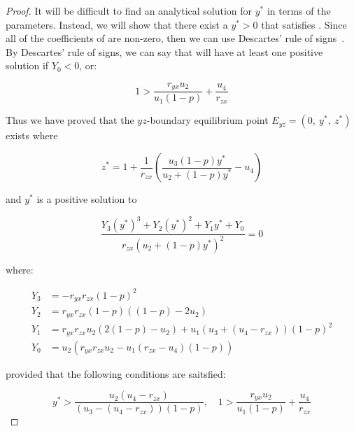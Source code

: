\begin{proof}
    It will be difficult to find an analytical solution for $y^*$ in terms of the parameters. Instead, we will show that there exist a $y^*>0$ that satisfies . Since all of the coefficients of  are non-zero, then we can use Descartes' rule of signs~\cite{WANG2004525526}. By Descartes' rule of signs, we can say that  will have at least one positive solution if $Y_0<0$, or:
    
    \begin{equation*}
        1>\frac{r_{yx}u_2}{u_1\left(1-p\right)}+\frac{u_4}{r_{zx}}
    \end{equation*}

    Thus we have proved that the $yz$-boundary equilibrium point $E_{yz}=\left(0,\ y^*,\ z^*\right)$ exists where
    
    \begin{equation*}
        z^*=1+\frac{1}{r_{zx}}\left(\frac{u_3\left(1-p\right)y^*}{u_2+\left(1-p\right)y^*}-u_4\right)
    \end{equation*}

    and $y^*$ is a positive solution to 

    \begin{equation*}
        \frac{Y_3\left(y^*\right)^3+Y_2\left(y^*\right)^2+Y_1y^*+Y_0}{r_{zx}\left(u_2+\left(1-p\right)y^*\right)^2}=0
    \end{equation*}

    where:

    \begin{align*}
        Y_3 &= -r_{yx}r_{zx}\left(1-p\right)^2\\
        Y_2 &= r_{yx}r_{zx}\left(1-p\right)\left(\left(1-p\right)-2u_2\right)\\
        Y_1 &= r_{yx}r_{zx}u_2\left(2\left(1-p\right)-u_2\right)+u_1\left(u_3+\left(u_4-r_{zx}\right)\right)\left(1-p\right)^2\\
        Y_0 &= u_2\left(r_{yx}r_{zx}u_2-u_1\left(r_{zx}-u_4\right)\left(1-p\right)\right)
    \end{align*}

    provided that the following conditions are saitsfied:
    
    \begin{equation*}
        y^*>\frac{u_2\left(u_4-r_{zx}\right)}{\left(u_3-\left(u_4-r_{zx}\right)\right)\left(1-p\right)},\quad 1>\frac{r_{yx}u_2}{u_1\left(1-p\right)}+\frac{u_4}{r_{zx}}
    \end{equation*}
\end{proof}

